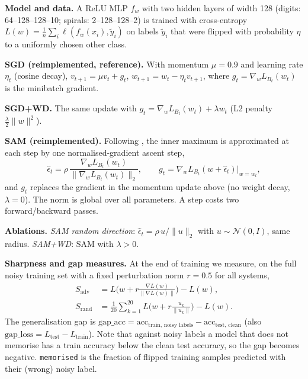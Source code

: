 \textbf{Model and data.} A ReLU MLP $f_w$ with two hidden layers of width 128 (digits: 64--128--128--10; spirals: 2--128--128--2) is trained with cross-entropy $L(w)=\frac1n\sum_i \ell(f_w(x_i),\tilde y_i)$ on labels $\tilde y_i$ that were flipped with probability $\eta$ to a uniformly chosen other class.

\textbf{SGD (reimplemented, reference).} With momentum $\mu=0.9$ and learning rate $\eta_t$ (cosine decay), $v_{t+1}=\mu v_t+g_t$, $w_{t+1}=w_t-\eta_t v_{t+1}$, where $g_t=\nabla_w L_{B_t}(w_t)$ is the minibatch gradient.

\textbf{SGD+WD.} The same update with $g_t=\nabla_w L_{B_t}(w_t)+\lambda w_t$ (L2 penalty $\tfrac{\lambda}{2}\|w\|^2$).

\textbf{SAM (reimplemented).} Following \cite{foret2020sharpness}, the inner maximum is approximated at each step by one normalised-gradient ascent step,
\begin{equation}
\hat\epsilon_t=\rho\,\frac{\nabla_w L_{B_t}(w_t)}{\|\nabla_w L_{B_t}(w_t)\|_2},\qquad g_t=\nabla_w L_{B_t}(w+\hat\epsilon_t)\big|_{w=w_t},
\end{equation}
and $g_t$ replaces the gradient in the momentum update above (no weight decay, $\lambda=0$). The norm is global over all parameters. A step costs two forward/backward passes.

\textbf{Ablations.} \emph{SAM random direction}: $\hat\epsilon_t=\rho\,u/\|u\|_2$ with $u\sim\mathcal N(0,I)$, same radius. \emph{SAM+WD}: SAM with $\lambda>0$.

\textbf{Sharpness and gap measures.} At the end of training we measure, on the full noisy training set with a fixed perturbation norm $r=0.5$ for all systems,
\begin{align}
S_{\mathrm{adv}}&=L\!\Big(w+r\tfrac{\nabla L(w)}{\|\nabla L(w)\|}\Big)-L(w),\\
S_{\mathrm{rand}}&=\tfrac1{20}\sum_{k=1}^{20}L\!\Big(w+r\tfrac{u_k}{\|u_k\|}\Big)-L(w).
\end{align}
The generalisation gap is $\mathrm{gap\_acc}=\mathrm{acc}_{\text{train, noisy labels}}-\mathrm{acc}_{\text{test, clean}}$ (also $\mathrm{gap\_loss}=L_{\text{test}}-L_{\text{train}}$). Note that against noisy labels a model that does not memorise has a train accuracy below the clean test accuracy, so the gap becomes negative. \texttt{memorised} is the fraction of flipped training samples predicted with their (wrong) noisy label.
